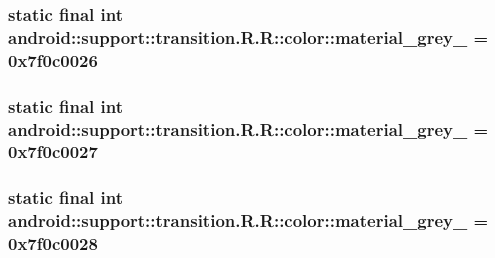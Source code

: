 \hypertarget{classandroid_1_1support_1_1transition_1_1_r_1_1color_a464c7d04bfad278978c81ea35f0d710}{
\subsubsection[{material\_\-grey\_\-50}]{\setlength{\rightskip}{0pt plus 5cm}static final int android::support::transition.R.R::color::material\_\-grey\_ = 0x7f0c0026}}
\label{classandroid_1_1support_1_1transition_1_1_r_1_1color_a464c7d04bfad278978c81ea35f0d710}


\hypertarget{classandroid_1_1support_1_1transition_1_1_r_1_1color_94507732183dfaec360f496bc85331fd}{
\subsubsection[{material\_\-grey\_\-600}]{\setlength{\rightskip}{0pt plus 5cm}static final int android::support::transition.R.R::color::material\_\-grey\_ = 0x7f0c0027}}
\label{classandroid_1_1support_1_1transition_1_1_r_1_1color_94507732183dfaec360f496bc85331fd}


\hypertarget{classandroid_1_1support_1_1transition_1_1_r_1_1color_5b14f9f2d33701c161994633825205d4}{
\subsubsection[{material\_\-grey\_\-800}]{\setlength{\rightskip}{0pt plus 5cm}static final int android::support::transition.R.R::color::material\_\-grey\_ = 0x7f0c0028}}
\label{classandroid_1_1support_1_1transition_1_1_r_1_1color_5b14f9f2d33701c161994633825205d4}


